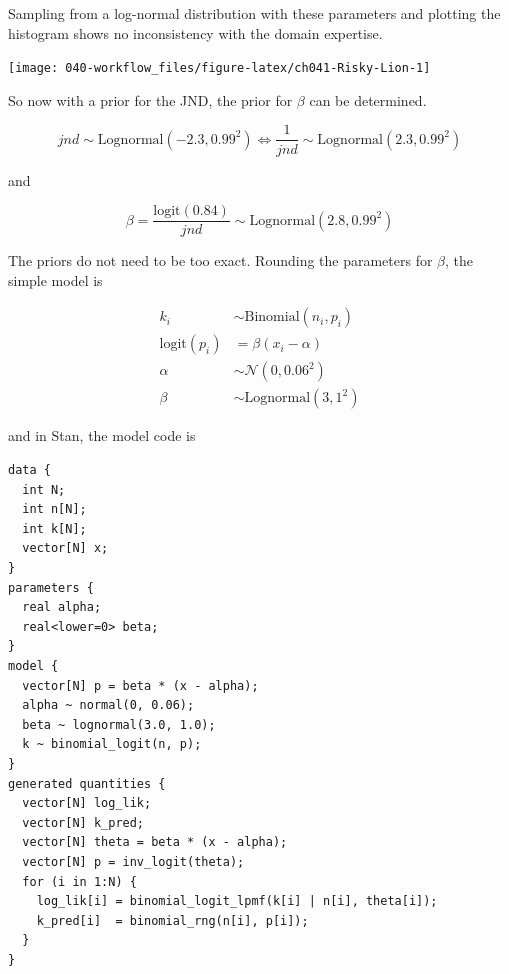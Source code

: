 \documentclass[11pt, oneside, openany]{scrbook}
\newenvironment{Shaded}{\begin{snugshade}}{\end{snugshade}}
\newcommand{\CommentTok}[1]{\textcolor[rgb]{0.56,0.35,0.01}{\textit{#1}}}
\newcommand{\DataTypeTok}[1]{\textcolor[rgb]{0.13,0.29,0.53}{#1}}
\newcommand{\DecValTok}[1]{\textcolor[rgb]{0.00,0.00,0.81}{#1}}
\newcommand{\KeywordTok}[1]{\textcolor[rgb]{0.13,0.29,0.53}{\textbf{#1}}}
\newcommand{\NormalTok}[1]{#1}
\newcommand{\OperatorTok}[1]{\textcolor[rgb]{0.81,0.36,0.00}{\textbf{#1}}}
\newcommand{\StringTok}[1]{\textcolor[rgb]{0.31,0.60,0.02}{#1}}
\begin{document}
\begin{Shaded}
\end{Shaded}

Sampling from a log-normal distribution with these parameters and plotting the histogram shows no inconsistency with the domain expertise.

\begin{center}\texttt{[image: 040-workflow\_files/figure-latex/ch041-Risky-Lion-1]} \end{center}

So now with a prior for the JND, the prior for \(\beta\) can be determined.

\[
jnd \sim \mathrm{Lognormal}(-2.3, 0.99^2) \Longleftrightarrow \frac{1}{jnd} \sim \mathrm{Lognormal}(2.3, 0.99^2)
\]

and

\[
\beta = \frac{\mathrm{logit}(0.84)}{jnd} \sim \mathrm{Lognormal}(2.8, 0.99^2)
\]

The priors do not need to be too exact. Rounding the parameters for \(\beta\), the simple model is

\begin{align*}
  k_i &\sim \mathrm{Binomial}(n_i, p_i) \\
  \mathrm{logit}(p_i) &= \beta ( x_i - \alpha ) \\
  \alpha &\sim \mathcal{N}(0, 0.06^2) \\
  \beta &\sim \mathrm{Lognormal}(3, 1^2)
\end{align*}

and in Stan, the model code is

\begin{verbatim}
data {
  int N;
  int n[N];
  int k[N];
  vector[N] x;
}
parameters {
  real alpha;
  real<lower=0> beta;
}
model {
  vector[N] p = beta * (x - alpha);
  alpha ~ normal(0, 0.06);
  beta ~ lognormal(3.0, 1.0);
  k ~ binomial_logit(n, p);
}
generated quantities {
  vector[N] log_lik;
  vector[N] k_pred;
  vector[N] theta = beta * (x - alpha);
  vector[N] p = inv_logit(theta);
  for (i in 1:N) {
    log_lik[i] = binomial_logit_lpmf(k[i] | n[i], theta[i]);
    k_pred[i]  = binomial_rng(n[i], p[i]);
  }
}
\end{verbatim}
\end{document}
